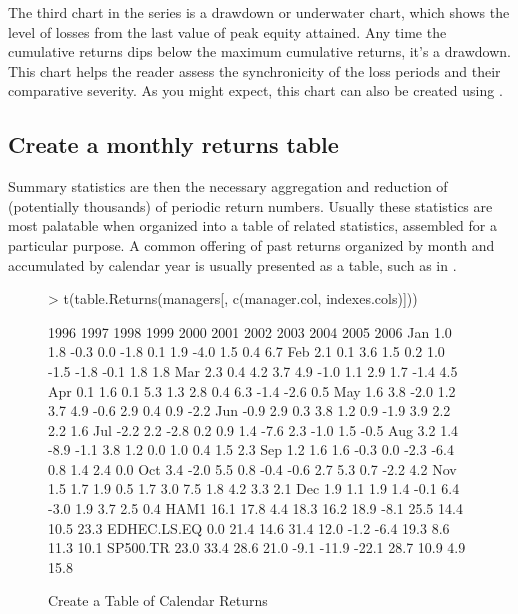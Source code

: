 \documentclass[12pt,letterpaper,english]{article}
\begin{document}
The third chart in the series is a drawdown or underwater chart, which
shows the level of losses from the last value of peak equity attained.
Any time the cumulative returns dips below the maximum cumulative
returns, it's a drawdown. This chart helps the reader assess the synchronicity
of the loss periods and their comparative severity. As you might expect,
this chart can also be created using .


\subsection{Create a monthly returns table}

Summary statistics are then the necessary aggregation and reduction
of (potentially thousands) of periodic return numbers. Usually these
statistics are most palatable when organized into a table of related
statistics, assembled for a particular purpose. A common offering
of past returns organized by month and accumulated by calendar year
is usually presented as a table, such as in .

%
\begin{figure}

\caption{Create a Table of Calendar Returns}

\label{fig:Calendar-Returns}

\begin{center}

\begin{Schunk}
\begin{Sinput}
> t(table.Returns(managers[, c(manager.col, indexes.cols)]))
\end{Sinput}
\begin{Soutput}
            1996 1997 1998 1999 2000  2001  2002 2003 2004 2005 2006
Jan          1.0  1.8 -0.3  0.0 -1.8   0.1   1.9 -4.0  1.5  0.4  6.7
Feb          2.1  0.1  3.6  1.5  0.2   1.0  -1.5 -1.8 -0.1  1.8  1.8
Mar          2.3  0.4  4.2  3.7  4.9  -1.0   1.1  2.9  1.7 -1.4  4.5
Apr          0.1  1.6  0.1  5.3  1.3   2.8   0.4  6.3 -1.4 -2.6  0.5
May          1.6  3.8 -2.0  1.2  3.7   4.9  -0.6  2.9  0.4  0.9 -2.2
Jun         -0.9  2.9  0.3  3.8  1.2   0.9  -1.9  3.9  2.2  2.2  1.6
Jul         -2.2  2.2 -2.8  0.2  0.9   1.4  -7.6  2.3 -1.0  1.5 -0.5
Aug          3.2  1.4 -8.9 -1.1  3.8   1.2   0.0  1.0  0.4  1.5  2.3
Sep          1.2  1.6  1.6 -0.3  0.0  -2.3  -6.4  0.8  1.4  2.4  0.0
Oct          3.4 -2.0  5.5  0.8 -0.4  -0.6   2.7  5.3  0.7 -2.2  4.2
Nov          1.5  1.7  1.9  0.5  1.7   3.0   7.5  1.8  4.2  3.3  2.1
Dec          1.9  1.1  1.9  1.4 -0.1   6.4  -3.0  1.9  3.7  2.5  0.4
HAM1        16.1 17.8  4.4 18.3 16.2  18.9  -8.1 25.5 14.4 10.5 23.3
EDHEC.LS.EQ  0.0 21.4 14.6 31.4 12.0  -1.2  -6.4 19.3  8.6 11.3 10.1
SP500.TR    23.0 33.4 28.6 21.0 -9.1 -11.9 -22.1 28.7 10.9  4.9 15.8
\end{Soutput}
\end{Schunk}

\end{center}
\end{figure}
\end{document}

